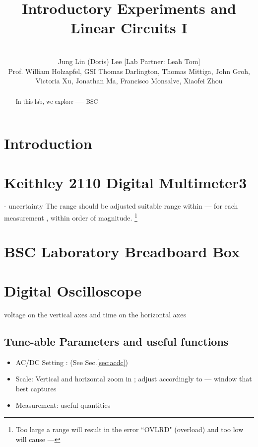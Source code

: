 \documentclass[10pt,letterpaper,oneside] {article}
\begin{document}
\title{Introductory Experiments and Linear Circuits I}
\author{\quad \\Jung Lin (Doris) Lee [Lab Partner: Leah Tom]\\Prof. William Holzapfel, GSI Thomas Darlington, Thomas Mittiga, John Groh,  \\Victoria Xu, Jonathan Ma, Francisco Monsalve, Xiaofei Zhou}
\maketitle
	\begin{abstract}
	In this lab, we explore ----- BSC 
	\end{abstract}


\section{Introduction}
 

\section{Keithley 2110 Digital Multimeter3}
- uncertainty
The range should be adjusted  suitable range within --- for each measurement , within order of magnitude. \footnote{Too large a range will result in the error ``OVLRD" (overload) and too low will cause ---}
\section{BSC Laboratory Breadboard Box}

\section{Digital Oscilloscope}
voltage on the vertical axes and time on the horizontal axes
\subsection{Tune-able Parameters and useful functions}
\begin{itemize}
\item AC/DC Setting : (See Sec.\ref{sec:acdc})
\item Scale: Vertical and horizontal zoom in ; adjust accordingly to --- window that best captures
\item Measurement: useful quantities 
\end{itemize}
\end{document}

